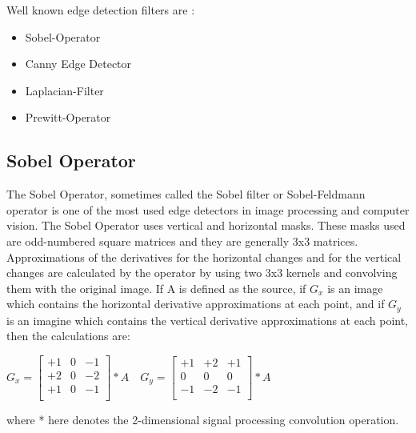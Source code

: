 Well known edge detection filters are :

\begin{itemize}

 \item Sobel-Operator
 \item Canny Edge Detector
 \item Laplacian-Filter
 \item Prewitt-Operator
 
 \end{itemize}


%
\subsection{Sobel Operator}\label{sec:Sobel Operator}

The Sobel Operator, sometimes called the Sobel filter or Sobel-Feldmann operator is one of the most used edge detectors in image processing and computer vision. The Sobel Operator uses vertical and horizontal masks. These masks used are odd-numbered square matrices and they are generally 3x3 matrices. Approximations of the derivatives for the horizontal changes and for the vertical changes are calculated by the operator by using two 3x3 kernels and convolving them with the original image. If A is defined as the source, if $G_{x}$ is an image which contains the horizontal derivative approximations at each point, and if $G_{y}$ is an imagine which contains the vertical derivative approximations at each point, then the calculations are\cite{SobelOperatorandCannyEdgeDetector}:

\begin{center}

$  G_{x} = 
  \begin{bmatrix}
	+1 & 0 & -1 \\
	+2 & 0 & -2 \\
	+1 & 0 & -1 \\
   \end{bmatrix} * A  \quad
  G_{y} = 
  \begin{bmatrix}
	+1 & +2 & +1 \\
	0 & 0 & 0 \\
	-1 & -2 & -1 \\
  \end{bmatrix} * A		$

\end{center}

where * here denotes the 2-dimensional signal processing convolution operation.

